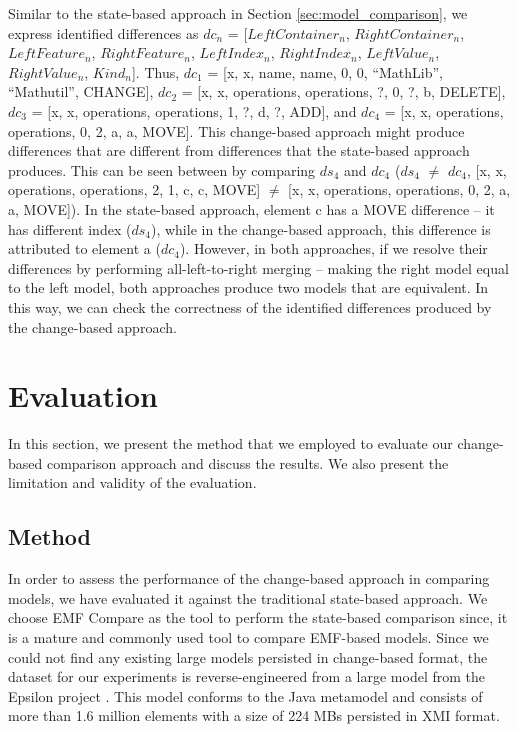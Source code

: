 \documentclass{jot}
\begin{document}
Similar to the state-based approach in Section \ref{sec:model_comparison}, we express identified differences as $dc_{n}$ = [$LeftContainer_n$, $RightContainer_n$, $LeftFeature_n$, $RightFeature_n$, $LeftIndex_n$, $RightIndex_n$, $LeftValue_n$, $RightValue_n$, $Kind_n$]. Thus, $dc_{1}$ =  [\textsf{x}, \textsf{x}, \textsf{name}, \textsf{name}, 0, 0, ``MathLib'', ``Mathutil'', \textsf{CHANGE}], $dc_{2}$ = [\textsf{x}, \textsf{x}, \textsf{operations}, \textsf{operations}, ?, 0, ?, \textsf{b}, \textsf{DELETE}], $dc_{3}$ = [\textsf{x}, \textsf{x}, \textsf{operations}, \textsf{operations}, 1, ?, \textsf{d}, ?, \textsf{ADD}], and $dc_{4}$ = [\textsf{x}, \textsf{x}, \textsf{operations}, \textsf{operations}, 0, 2, \textsf{a}, \textsf{a}, \textsf{MOVE}]. This change-based approach might produce differences that are different from differences that the state-based approach produces. This can be seen between by comparing $ds_{4}$ and $dc_{4}$ ($ds_{4}$ $\neq$ $dc_{4}$, [\textsf{x}, \textsf{x}, \textsf{operations}, \textsf{operations}, 2, 1, \textsf{c}, \textsf{c}, \textsf{MOVE}] $\neq$ [\textsf{x}, \textsf{x}, \textsf{operations}, \textsf{operations}, 0, 2, \textsf{a}, \textsf{a}, \textsf{MOVE}]). In the state-based approach, element \textsf{c} has a \textsf{MOVE} difference -- it has different index ($ds_{4}$), while in the change-based approach, this difference is attributed to element \textsf{a} ($dc_{4}$). However, in both approaches, if we resolve their differences by performing all-left-to-right merging  -- making the right model equal to the left model, both approaches produce two models that are equivalent. In this way, we can check the correctness of the identified differences produced by the change-based approach.

\section{Evaluation}
\label{sec:evaluation}
In this section, we present the method that we employed to evaluate our change-based comparison approach and discuss the results. We also present the limitation and validity of the evaluation.
\subsection{Method}
\label{sec:method}
In order to assess the performance of the change-based approach in comparing models, we have evaluated it against the traditional state-based approach. We choose EMF Compare \cite{emfcompare2018developer,eclipse2017compare} as the tool to perform the state-based comparison since, it is a mature and commonly used tool to compare EMF-based models. Since we could not find any existing large models persisted in change-based format, the dataset for our experiments is reverse-engineered from a large model from the Epsilon project \cite{eclipse2018epsilongit,eclipse2017epsilon}. This model conforms to the Java metamodel \cite{eclipse2018modiscojava} and consists of more than 1.6 million elements with a size of 224 MBs persisted in XMI format. 
\end{document}
